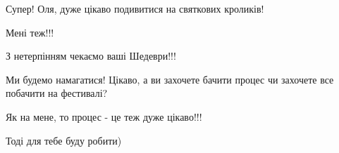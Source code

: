  
 
 
 
 

\qqSecCmt


Супер! Оля, дуже цікаво подивитися на святкових кроликів!

\begin{itemize} %
Мені теж!!!
\end{itemize} %


З нетерпінням чекаємо ваші Шедеври!!!

\begin{itemize} %

Ми будемо намагатися! Цікаво, а ви захочете бачити процес чи захочете все побачити на фестивалі?
\end{itemize} %


Як на мене, то процес - це теж дуже цікаво!!!

\begin{itemize} %
Тоді для тебе буду робити)
\end{itemize} %
